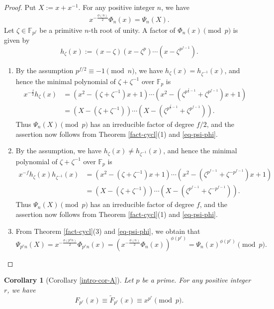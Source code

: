\documentclass[a4paper, 11pt]{amsart}
\numberwithin{equation}{section}
\newtheorem{cor}[thm]{Corollary}
\theoremstyle{definition}
\newcommand{\F}{\mathbb{F}}
\begin{document}
\begin{proof}
Put $X:=x+x^{-1}$.
For any positive integer $n$, we have 
\begin{align}\label{eq-psi-phi}
x^{-\frac{\phi(n)}2}\Phi_n(x)=\Psi_n(X).
\end{align}
Let $\zeta\in \F_{p^f}$ be a primitive $n$-th root of unity.
A factor of $\Phi_n(x)\pmod p$ is given by
\[
h_\zeta(x):=(x-\zeta)(x-\zeta^p)\cdots (x-\zeta^{p^{f-1}}).
\]
\begin{enumerate}[{\rm (1)}]
\item
By the assumption $p^{f/2}\equiv -1\pmod n$, we have $h_\zeta(x)=h_{\zeta^{-1}}(x)$, and hence the minimal polynomial of $\zeta+\zeta^{-1}$ over $\F_p$ is
\begin{align*}
x^{-\frac f2}h_\zeta(x)
&=(x^2-(\zeta+\zeta^{-1})x+1)\cdots (x^2-(\zeta^{p^{\frac f2-1}}+\zeta^{p^{f-1}})x+1)\\
&=(X-(\zeta+\zeta^{-1}))\cdots (X-(\zeta^{p^{\frac f2-1}}+\zeta^{p^{f-1}})).
\end{align*}
Thus $\Psi_n(X)\pmod p$ has an irreducible factor of degree $f/2$, and the assertion now follows from Theorem \ref{fact-cycl}(1) and \eqref{eq-psi-phi}.
\item
By the assumption, we have $h_\zeta(x)\neq h_{\zeta^{-1}}(x)$, and hence the minimal polynomial of $\zeta+\zeta^{-1}$ over $\F_p$ is
\begin{align*}
x^{-f}h_\zeta(x)h_{\zeta^{-1}}(x)
&=(x^2-(\zeta+\zeta^{-1})x+1)\cdots (x^2-(\zeta^{p^{f-1}}+\zeta^{-p^{f-1}})x+1)\\
&=(X-(\zeta+\zeta^{-1}))\cdots (X-(\zeta^{p^{f-1}}+\zeta^{-p^{f-1}})).
\end{align*}
Thus $\Psi_n(X)\pmod p$ has an irreducible factor of degree $f$, and the assertion now follows from Theorem \ref{fact-cycl}(1) and \eqref{eq-psi-phi}.


\item
From Theorem \ref{fact-cycl}(3) and \eqref{eq-psi-phi}, we obtain that 
\[
\Psi_{p^rn}(X)=x^{-\frac{\phi(p^rn)}2}\Phi_{p^rn}(x)=\left(x^{-\frac{\phi(n)}2}\Phi_n(x)\right)^{\phi(p^r)}=\Psi_n(x)^{\phi(p^r)}\pmod p.
\]
\end{enumerate}
\end{proof}

\begin{cor}[Corollary \ref{intro-cor-A}]\label{cor-A}
Let $p$ be a prime.
For any positive integer $r$, we have
\[
F_{p^r}(x)\equiv \tilde{F}_{p^r}(x)\equiv x^{p^r}\pmod p.
\]
\end{cor}
\end{document}
